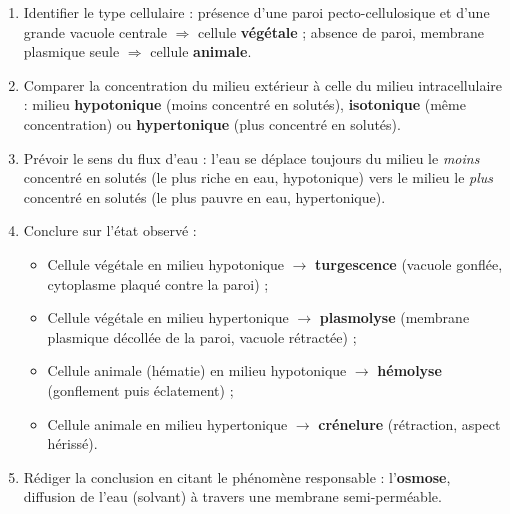 \documentclass[11pt]{article}
\newcommand{\cle}[1]{{\popxbold\color{popdark}#1}}
\begin{document}
\begin{methode}
\begin{enumerate}
\item \cle{Identifier le type cellulaire} : présence d'une paroi pecto-cellulosique et d'une grande vacuole centrale $\Rightarrow$ cellule \textbf{végétale} ; absence de paroi, membrane plasmique seule $\Rightarrow$ cellule \textbf{animale}.
\item \cle{Comparer la concentration} du milieu extérieur à celle du milieu intracellulaire : milieu \textbf{hypotonique} (moins concentré en solutés), \textbf{isotonique} (même concentration) ou \textbf{hypertonique} (plus concentré en solutés).
\item \cle{Prévoir le sens du flux d'eau} : l'eau se déplace toujours du milieu le \emph{moins} concentré en solutés (le plus riche en eau, hypotonique) vers le milieu le \emph{plus} concentré en solutés (le plus pauvre en eau, hypertonique).
\item \cle{Conclure sur l'état observé} :
\begin{itemize}
\item Cellule végétale en milieu hypotonique $\rightarrow$ \textbf{turgescence} (vacuole gonflée, cytoplasme plaqué contre la paroi) ;
\item Cellule végétale en milieu hypertonique $\rightarrow$ \textbf{plasmolyse} (membrane plasmique décollée de la paroi, vacuole rétractée) ;
\item Cellule animale (hématie) en milieu hypotonique $\rightarrow$ \textbf{hémolyse} (gonflement puis éclatement) ;
\item Cellule animale en milieu hypertonique $\rightarrow$ \textbf{crénelure} (rétraction, aspect hérissé).
\end{itemize}
\item \cle{Rédiger la conclusion} en citant le phénomène responsable : l'\textbf{osmose}, diffusion de l'eau (solvant) à travers une membrane semi-perméable.
\end{enumerate}
\end{methode}
\end{document}
